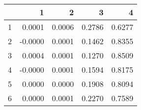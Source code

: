 \begin{table}[ht]
\begin{center}
\begin{tabular}{rrrrr}
  \hline
 & 1 & 2 & 3 & 4 \\ 
  \hline
1 & 0.0001 & 0.0006 & 0.2786 & 0.6277 \\ 
  2 & -0.0000 & 0.0001 & 0.1462 & 0.8355 \\ 
  3 & 0.0004 & 0.0001 & 0.1270 & 0.8509 \\ 
  4 & -0.0000 & 0.0001 & 0.1594 & 0.8175 \\ 
  5 & 0.0000 & 0.0000 & 0.1908 & 0.8094 \\ 
  6 & 0.0000 & 0.0001 & 0.2270 & 0.7589 \\ 
   \hline
\end{tabular}
\end{center}
\end{table}
